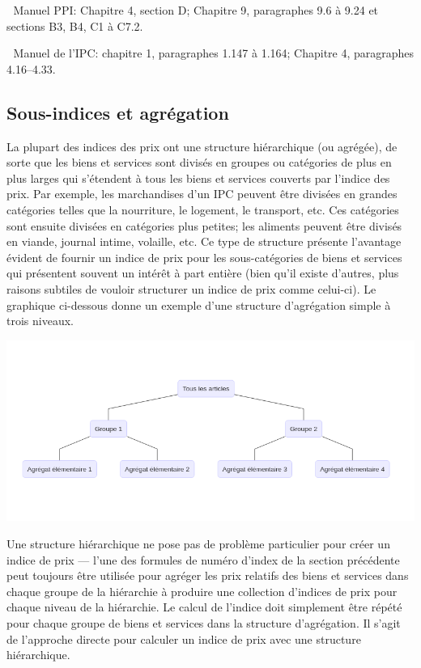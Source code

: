 \documentclass[]{article}
\begin{document}
📖 Manuel PPI: Chapitre 4, section D; Chapitre 9, paragraphes 9.6 à 9.24 et sections B3, B4, C1 à C7.2.

📖 Manuel de l'IPC: chapitre 1, paragraphes 1.147 à 1.164; Chapitre 4, paragraphes 4.16--4.33.

\hypertarget{sous-indices-et-agruxe9gation}{%
\subsection{Sous-indices et agrégation}\label{sous-indices-et-agruxe9gation}}

La plupart des indices des prix ont une structure hiérarchique (ou agrégée), de sorte que les biens et services sont divisés en groupes ou catégories de plus en plus larges qui s'étendent à tous les biens et services couverts par l'indice des prix. Par exemple, les marchandises d'un IPC peuvent être divisées en grandes catégories telles que la nourriture, le logement, le transport, etc. Ces catégories sont ensuite divisées en catégories plus petites; les aliments peuvent être divisés en viande, journal intime, volaille, etc. Ce type de structure présente l'avantage évident de fournir un indice de prix pour les sous-catégories de biens et services qui présentent souvent un intérêt à part entière (bien qu'il existe d'autres, plus raisons subtiles de vouloir structurer un indice de prix comme celui-ci). Le graphique ci-dessous donne un exemple d'une structure d'agrégation simple à trois niveaux.

\includegraphics{img/plot1.png}

Une structure hiérarchique ne pose pas de problème particulier pour créer un indice de prix --- l'une des formules de numéro d'index de la section précédente peut toujours être utilisée pour agréger les prix relatifs des biens et services dans chaque groupe de la hiérarchie à produire une collection d'indices de prix pour chaque niveau de la hiérarchie. Le calcul de l'indice doit simplement être répété pour chaque groupe de biens et services dans la structure d'agrégation. Il s'agit de l'approche directe pour calculer un indice de prix avec une structure hiérarchique.
\end{document}

